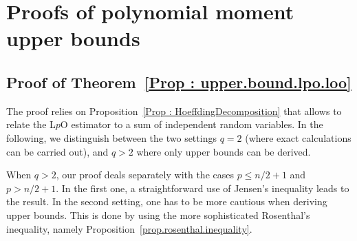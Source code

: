 \documentclass[twoside,11pt]{article}
\numberwithin{equation}{section}
\newcommand{\1}{\mathds{1}}%
\numberwithin{equation}{section}
\theoremstyle{plain}
\begin{document}





\newpage
\appendix \label{Section: appendix}











\section{Proofs of polynomial moment upper bounds}

\subsection{Proof of Theorem~\ref{Prop : upper.bound.lpo.loo}}
%
\label{Appendix: UpperBoundLpO.L1O}
%
The proof relies on Proposition~\ref{Prop : HoeffdingDecomposition} that allows to relate the L$p$O estimator to a sum of independent random variables.
%
In the following, we distinguish between the two settings $q=2$ (where exact calculations can be carried out), and $q>2$ where only upper bounds can be derived.

When $q>2$, our proof deals separately with the cases $p\leq n/2+1$ and $p>n/2+1$.
%
In the first one, a straightforward use of Jensen's inequality leads to the result.
%
In the second setting, one has to be more cautious when deriving upper bounds. This is done by using the more sophisticated Rosenthal's inequality, namely Proposition~\ref{prop.rosenthal.inequality}.
\end{document}
